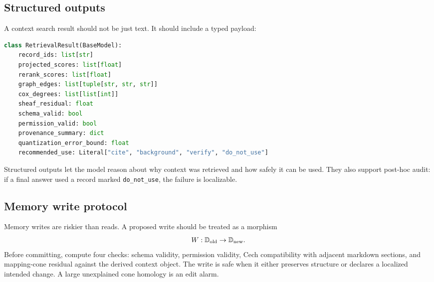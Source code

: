 \documentclass[11pt]{article}
\numberwithin{equation}{section}
\begin{document}
\subsection{Structured outputs}
A context search result should not be just text. It should include a typed payload:
\begin{lstlisting}[language=Python,caption={Structured retrieval result sketch.}]
class RetrievalResult(BaseModel):
    record_ids: list[str]
    projected_scores: list[float]
    rerank_scores: list[float]
    graph_edges: list[tuple[str, str, str]]
    cox_degrees: list[list[int]]
    sheaf_residual: float
    schema_valid: bool
    permission_valid: bool
    provenance_summary: dict
    quantization_error_bound: float
    recommended_use: Literal["cite", "background", "verify", "do_not_use"]
\end{lstlisting}
Structured outputs let the model reason about why context was retrieved and how safely it can be used. They also support post-hoc audit: if a final answer used a record marked \texttt{do\_not\_use}, the failure is localizable.

\subsection{Memory write protocol}
Memory writes are riskier than reads. A proposed write should be treated as a morphism
\begin{equation}
W:\mathbb{D}_{\rm old}\to\mathbb{D}_{\rm new}.
\end{equation}
Before committing, compute four checks: schema validity, permission validity, Cech compatibility with adjacent markdown sections, and mapping-cone residual against the derived context object. The write is safe when it either preserves structure or declares a localized intended change. A large unexplained cone homology is an edit alarm.
\end{document}
